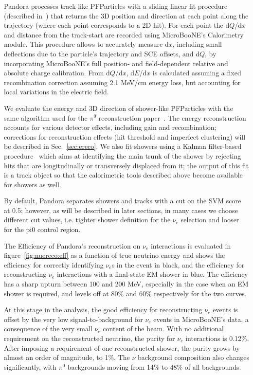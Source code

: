 \documentclass[a4paper]{article}
\begin{document}
Pandora processes track-like PFParticles with a sliding linear fit procedure (described in~\cite{bib:pandoraub}) that returns the 3D position and direction at each point along the trajectory (where each point corresponds to a 2D hit). For each point the d$Q$/d$x$ and distance from the track-start are recorded using MicroBooNE's Calorimetry module. This procedure allows to accurately measure d$x$, including small deflections due to the particle's trajectory and SCE offsets, and d$Q$, by incorporating MicroBooNE's full position- and field-dependent relative and absolute charge calibration. From d$Q$/d$x$, d$E$/d$x$ is calculated assuming a fixed recombination correction assuming 2.1 MeV/cm energy loss, but accounting for local variations in the electric field.

We evaluate the energy and 3D direction of shower-like PFParticles with the same algorithm used for the $\pi^0$ reconstruction paper~\cite{bib:pi0reco}. The energy reconstruction accounts for various detector effects, including gain and recombination; corrections for reconstruction effects (hit threshold and imperfect clustering) will be described in Sec.~\ref{sec:ereco}. We also fit showers using a Kalman filter-based procedure~\cite{bib:shrtrackfitter} which aims at identifying the main trunk of the shower by rejecting hits that are longitudinally or transversely displaced from it; the output of this fit is a track object so that the calorimetric tools described above become available for showers as well.

By default, Pandora separates showers and tracks with a cut on the SVM score at 0.5; however, as will be described in later sections, in many cases we choose different cut values, i.e. tighter shower definition for the $\nu_e$ selection and looser for the pi0 control region.

\par The Efficiency of Pandora's reconstruction on $\nu_e$ interactions is evaluated in figure~\ref{fig:nuereco:eff} as a function of true neutrino energy and shows the efficiency for correctly identifying $\nu_e$s in the event in black, and the efficiency for reconstructing $\nu_e$ interactions with a final-state EM shower in blue. The efficiency has a sharp upturn between 100 and 200 MeV, especially in the case when an EM shower is required, and levels off at 80\% and 60\% respectively for the two curves. 
\par At this stage in the analysis, the good efficiency for reconstructing $\nu_e$ events is offset by the very low signal-to-background for $\nu_e$ events in MicroBooNE's data, a consequence of the very small $\nu_e$ content of the beam. With no additional requirement on the reconstructed neutrino, the purity for $\nu_e$ interactions is 0.12\%. After imposing a requirement of one reconstructed shower, the purity grows by almost an order of magnitude, to 1\%. The $\nu$ background composition also changes significantly, with $\pi^0$ backgrounds moving from 14\% to 48\% of all backgrounds.
\end{document}
